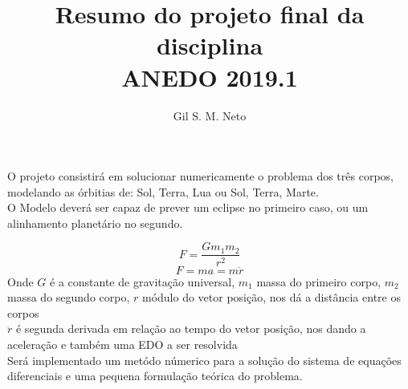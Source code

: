 \documentclass[12pt]{article}
\title{Resumo do projeto final da disciplina\\ANEDO 2019.1}
\author{Gil S. M. Neto}
\date{}
\begin{document}
\maketitle

O projeto consistirá em solucionar numericamente o problema dos três corpos, modelando as órbitias de: Sol, Terra, Lua ou Sol, Terra, Marte.\\
O Modelo deverá ser capaz de prever um eclipse no primeiro caso, ou um alinhamento planetário no segundo.

\[
F = \frac{Gm_1m_2}{r^2}
\]
\[
F = ma = m\ddot{r}
\]
Onde $G$ é a constante de gravitação universal, $m_1$ massa do primeiro corpo, $m_2$ massa do segundo corpo, $r$ módulo do vetor posição, nos dá a distância entre os corpos\\
$\ddot{r}$ é segunda derivada em relação ao tempo do vetor posição, nos dando a aceleração e também uma EDO a ser resolvida\\
Será implementado um metódo númerico para a solução do sistema de equações diferenciais e uma pequena formulação teórica do problema.
\end{document}
